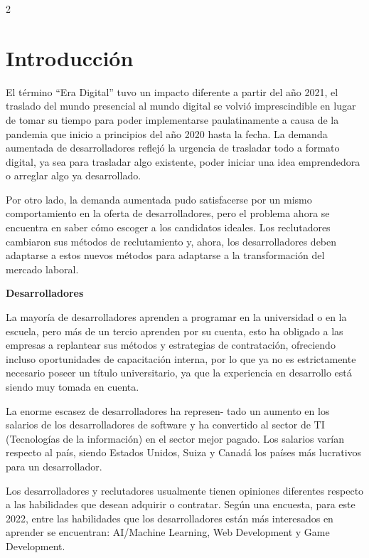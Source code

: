 \documentclass[12pt,spanish,Letterpaper,openany]{book}
\begin{document}
\begin {multicols}{2}

\hypertarget{introducciuxf3n-7}{%
\section{Introducción}\label{introducciuxf3n-7}}

El término ``Era Digital'' tuvo un impacto diferente a partir del año 2021, el traslado del mundo presencial al mundo digital se volvió imprescindible en lugar de tomar su tiempo para poder implementarse paulatinamente a causa de la pandemia que inicio a principios del año 2020 hasta la fecha. La demanda aumentada de desarrolladores reflejó la urgencia de trasladar todo a formato digital, ya sea para trasladar algo existente, poder iniciar una idea emprendedora o arreglar algo ya desarrollado.

Por otro lado, la demanda aumentada pudo satisfacerse por un mismo comportamiento en la oferta de desarrolladores, pero el problema ahora se encuentra en saber cómo escoger a los candidatos ideales. Los reclutadores cambiaron sus métodos de reclutamiento y, ahora, los desarrolladores deben adaptarse a estos nuevos métodos para adaptarse a la transformación del mercado laboral.

\textbf{Desarrolladores}

La mayoría de desarrolladores aprenden a programar en la universidad o en la escuela, pero más de un tercio aprenden por su cuenta, esto ha obligado a las empresas a replantear sus métodos y estrategias de contratación, ofreciendo incluso oportunidades de capacitación interna, por lo que ya no es estrictamente necesario poseer un título universitario, ya que la experiencia en desarrollo está siendo muy tomada en cuenta.

La enorme escasez de desarrolladores ha represen-
tado un aumento en los salarios de los desarrolladores de software y ha convertido al sector de TI (Tecnologías de la información) en el sector mejor pagado. Los salarios varían respecto al país, siendo Estados Unidos, Suiza y Canadá los países más lucrativos para un desarrollador.

Los desarrolladores y reclutadores usualmente tienen opiniones diferentes respecto a las habilidades que desean adquirir o contratar. Según una encuesta, para este 2022, entre las habilidades que los desarrolladores están más interesados en aprender se encuentran: AI/Machine Learning, Web Development y Game Development.


\end{multicols}
\end{document}
